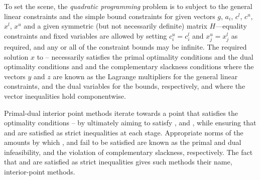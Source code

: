 \documentclass[twoside]{article}
\begin{document}
To set the scene, the {\em quadratic programming} problem is to
subject to the general linear constraints
and the simple bound constraints
for given
vectors $g$, $a_{i}$, $c^{l}$, $c^{u}$, $x^{l}$, $x^{u}$ 
and a given symmetric (but not necessarily definite) matrix $H$---equality 
constraints and fixed variables are allowed by setting
$c_{i}^{u} = c_{i}^{l}$ and $x_{j}^{u} = x_{j}^{l}$ as required,
and any or all of the constraint bounds may be infinite.
The required solution $x$ to -- necessarily satisfies 
the primal optimality conditions
and 
the dual optimality conditions
and 
and the complementary slackness conditions 
where the vectors $y$ and $z$ are 
known as the Lagrange multipliers for
the general linear constraints, and the dual variables for the bounds,
respectively, and where the vector inequalities hold componentwise.

Primal-dual interior point methods iterate towards a point
that satisfies the optimality conditions --
by ultimately aiming to satisfy
,  and , while ensuring that 
 and  are 
satisfied as strict inequalities at each stage. 
Appropriate norms of the amounts by 
which ,  and  fail to be satisfied are known as the
primal and dual infeasibility, and the violation of complementary slackness,
respectively. The fact that  and  are satisfied as strict 
inequalities gives such methods their name, interior-point methods.
\end{document}
